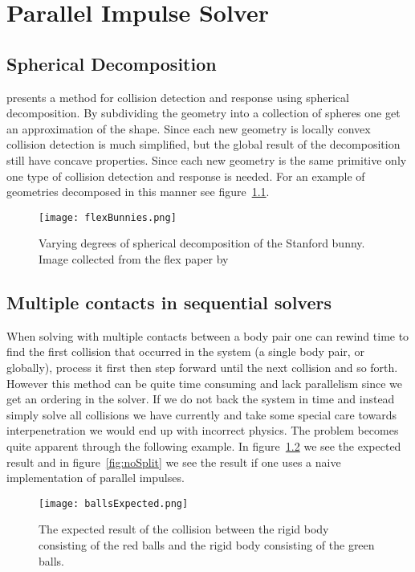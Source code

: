 \chapter{Parallel Impulse Solver}\label{cha:impl}

\section{Spherical Decomposition}
\cite{gpugems} presents a method for collision detection and response using spherical
decomposition. By subdividing the geometry into a collection of spheres one get an
approximation of the shape. Since each new geometry is locally convex collision
detection is much simplified, but the global result of the decomposition still have
concave properties. Since each new geometry is the same primitive only
one type of collision detection and response is needed. For an example of geometries
decomposed in this manner see figure~\ref{fig:bunnies}.

\begin{figure}[H]
  \centering
  \texttt{[image: flexBunnies.png]}
  \caption{Varying degrees of spherical decomposition of the Stanford bunny.
  Image collected from the flex paper by~\cite{flex}}
  \label{fig:bunnies}
\end{figure}

\section{Multiple contacts in sequential solvers}
When solving with multiple contacts between a body pair one can rewind time to
find the first collision
that occurred in the system (a single body pair, or globally), process it first
then step forward until the next collision and so forth. However this method can
be quite time consuming and lack parallelism since we get an ordering in the solver.
If we do not back the system in time and
instead simply solve all collisions we have currently and take some special care
towards interpenetration we would end up with incorrect physics. The problem
becomes quite apparent through the following example.
In figure~\ref{fig:ballsExpected} we see the expected result and in
figure~\ref{fig:noSplit} we see the result if one uses a naive implementation of
parallel impulses.

\begin{figure}[H]
  \centering
  \texttt{[image: ballsExpected.png]}
  \caption{The expected result of the collision between the rigid body consisting
  of the red balls and the rigid body consisting of the green balls.}
  \label{fig:ballsExpected}
\end{figure}

